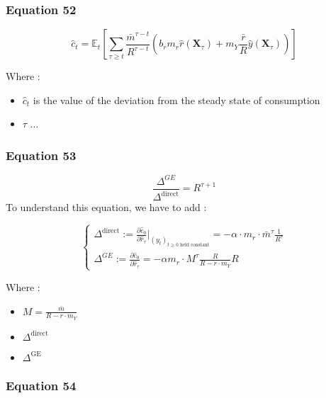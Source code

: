 \documentclass{article}
\begin{document}
\subsubsection*{Equation 52}

\begin{equation}\tag{52}
        \hat{c}_{t}=\mathbb{E}_{t}\left[\sum_{\tau\geq t}\frac{\bar{m}^{\tau-t}}{R^{\tau-t}}\left(b_{r}m_{r}\hat{r}(\textbf{X}_{\tau})+m_{Y}\frac{\bar{r}}{R}\hat{y}(\textbf{X}_{\tau})\right)\right]
\end{equation}

Where : 
\begin{itemize}
    \item $\hat{c}_{t}$ is the value of the deviation from the steady state of consumption
    \item $\tau$ ...
\end{itemize}

\subsubsection*{Equation 53}

\begin{equation}\tag{53}
    \frac{\Delta^{GE}}{\Delta^{\text{direct}}}=R^{\tau+1}
\end{equation}
To understand this equation, we have to add :

\begin{equation*}
    \begin{cases}
        \Delta^{\text{direct}}:=\frac{\partial \hat{c}_{0}}{\partial \hat{r}_{\tau}}\bigg\rvert_{(y_{t})_{t\geq0 \text{ held constant}}} = -\alpha\cdot m_{r}\cdot\bar{m}^{\tau}\frac{1}{R^{\tau}} \\
        \Delta^{GE}:=\frac{\partial \hat{c}_{0}}{\partial \hat{r}_{\tau}}=-\alpha m_{r}\cdot M^{\tau} \frac{R}{R-r\cdot m_{Y}}R 
    \end{cases}
\end{equation*}
    
Where : 
\begin{itemize}
    \item $M= \frac{\bar{m}}{R-r\cdot m_{Y}}$ 
    \item $\Delta^{\text{direct}}$
    \item $\Delta^{\text{GE}}$
\end{itemize}

\subsubsection*{Equation 54}
\end{document}
